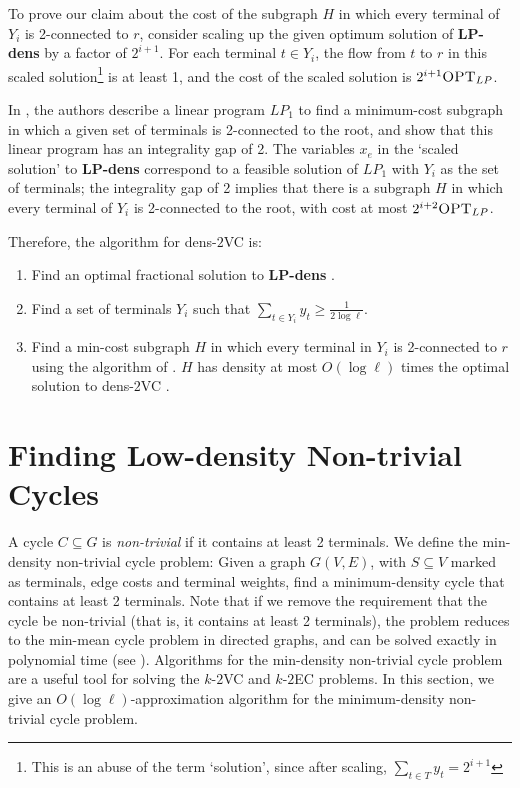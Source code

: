 \documentclass[11pt]{article}
\newcommand{\kec}[1]{$k$-$#1${\sc EC} }
\newcommand{\kvc}[1]{$k$-$#1${\sc VC} }
\newcommand{\ke}{\kec{2}}
\newcommand{\kv}{\kvc{2}}
\newcommand{\densV}{dens-$2${\sc VC} }
\newcommand{\densLP}{{\bf LP-dens} }
\newcommand{\opt}{\textrm{\sc OPT}}
\begin{document}
To prove our claim about the cost of the subgraph $H$ in which every
terminal of $Y_i$ is 2-connected to $r$, consider scaling up the given
optimum solution of \densLP by a factor of $2^{i+1}$. For each
terminal $t \in Y_i$, the flow from $t$ to $r$ in this scaled
solution\footnote{This is an abuse of the term `solution', since after
  scaling, $\sum_{t \in T} y_t = 2^{i+1}$} is at least 1, and the cost
of the scaled solution is $2^{i+1} \opt_{LP}$.

In \cite{FleischerJW}, the authors describe a linear program $LP_1$ to
find a minimum-cost subgraph in which a given set of terminals is
2-connected to the root, and show that this linear program has an
integrality gap of 2. The variables $x_e$ in the `scaled solution' to
\densLP correspond to a feasible solution of $LP_1$ with $Y_i$ as the
set of terminals; the integrality gap of 2 implies that there is a
subgraph $H$ in which every terminal of $Y_i$ is 2-connected to the
root, with cost at most $2^{i+2} \opt_{LP}$.

Therefore, the algorithm for \densV is: 
\begin{enumerate}
  \item Find an optimal fractional solution to \densLP.

  \item Find a set of terminals $Y_i$ such that $\sum_{t \in Y_i} y_t
    \ge \frac{1}{2 \log \ell}$.

  \item Find a min-cost subgraph $H$ in which every terminal in $Y_i$
    is 2-connected to $r$ using the algorithm of \cite{FleischerJW}.
    $H$ has density at most $O(\log \ell)$ times the optimal solution
    to \densV.
\end{enumerate}

\section{Finding Low-density Non-trivial Cycles}
\label{sec:cycles}

A cycle $C \subseteq G$ is \emph{non-trivial} if it contains at least 2
terminals.  We define the min-density non-trivial cycle problem: Given a
graph $G(V,E)$, with $S \subseteq V$ marked as terminals, edge costs and
terminal weights, find a minimum-density cycle that contains at least 2
terminals. Note that if we remove the requirement that the cycle be
non-trivial (that is, it contains at least 2 terminals), the problem
reduces to the min-mean cycle problem in directed graphs, and can be solved
exactly in polynomial time (see \cite{networkflows_book}).  Algorithms for
the min-density non-trivial cycle problem are a useful tool for solving the
\kv and \ke problems. In this section, we give an $O(\log
\ell)$-approximation algorithm for the minimum-density non-trivial cycle
problem.
\end{document}
